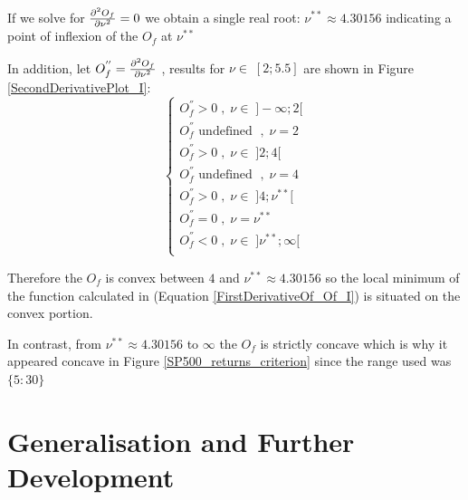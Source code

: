 If we solve for $\pdv[2]{O_f}{\nu} = 0$ we obtain a single real root: $\nu^{**} \approx 4.30156$ indicating a point of inflexion of the $O_f$ at $\nu^{**}$ 
\smallskip \par
In addition, let $O_f^{''}=\pdv[2]{O_f}{\nu}$ , results for $\nu \in \; [2;5.5]$ are shown in Figure \ref{SecondDerivativePlot_I}:
\begin{equation*}
    \begin{cases}
        O_f^{''} > 0 \; , \; \nu \in \; ]-\infty;2[ \\
        O_f^{''} \text{ undefined } \; , \; \nu = 2 \\
        O_f^{''} > 0 \; , \; \nu \in \; ]2;4[ \\
        O_f^{''} \text{ undefined } \; , \; \nu = 4 \\
        O_f^{''} > 0 \; , \; \nu \in \; ]4;\nu^{**}[ \\
        O_f^{''} = 0 \; , \; \nu = \nu^{**} \\
        O_f^{''} < 0 \; , \; \nu \in \; ]\nu^{**};\infty[ \\
    \end{cases}
\end{equation*}

Therefore the $O_f$ is convex between $4$ and $\nu^{**} \approx 4.30156$ so the local minimum of the function calculated in (Equation \ref{FirstDerivativeOf_Of_I}) is situated on the convex portion.
\smallskip\par
In contrast, from $\nu^{**} \approx 4.30156$ to $\infty$ the $O_f$ is strictly concave which is why it appeared concave in Figure \ref{SP500_returns_criterion} since the range used was $\{5:30\}$

\section{Generalisation and Further Development}

